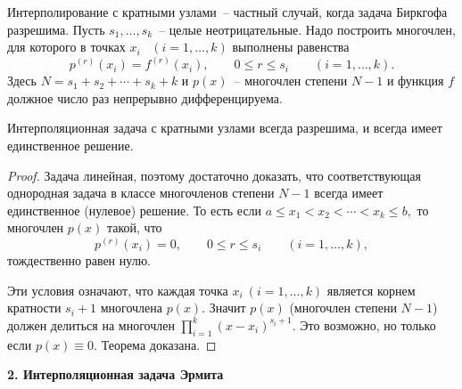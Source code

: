 Интерполирование с кратными узлами~-- частный случай,
когда задача Биркгофа разрешима.
Пусть
$s_1, \dots ,s_k$~-- целые {неотрицательные}.
Надо построить многочлен, для которого в точках
$x_i$~ $(i=1,\dots ,k)$ выполнены равенства
\[
  p^{(r)}(x_i)=f^{(r)}(x_i),\qquad 0 \le r \le s_i\qquad (i=1,\ldots ,k).
\]
Здесь $N=s_1+s_2+\cdots +s_k+k$
и $p(x)$~-- многочлен степени $N-1$
{и функция $f$} {должное число раз непрерывно дифференцируема}.

\begin{teo}
Интерполяционная задача с кратными узлами
всегда разрешима, {и} всегда имеет единственное решение.
\end{teo}

\begin{proof}
Задача линейная, поэтому достаточно доказать, что соответствующая однородная задача
в классе многочленов степени $N-1$ всегда имеет единственное (нулевое) решение.
То есть если $a \le x_1 < x_2 < \cdots < x_k \le b,$
то многочлен $p(x)$ такой, что
\[
 p^{(r)}(x_i)=0,\qquad 0 \le r \le s_i\qquad (i=1,\dots ,k),
\]
 тождественно равен нулю.

 Эти условия означают, что каждая
 точка $x_i\ (i=1,\ldots,k)$ является корнем кратности $s_i+1$ многочлена
 $p(x).$ Значит $p(x)$ (многочлен степени $N-1$) должен
 делиться на многочлен $\prod\limits_{i=1}^k
 (x-x_i)^{s_i+1}.$ Это возможно, но только если $p(x)\equiv 0.$
 Теорема доказана.
\end{proof}

\vspace{5mm}
{\bf 2. Интерполяционная задача Эрмита}
\vspace{5mm}

